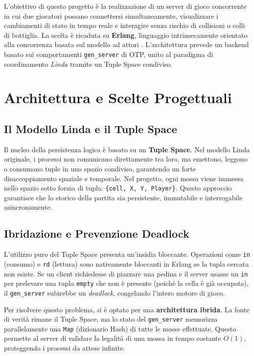 \documentclass{article}
\begin{document}
L'obiettivo di questo progetto \`e la realizzazione di un server di gioco concorrente in cui due giocatori possano connettersi simultaneamente, visualizzare i cambiamenti di stato in tempo reale e interagire senza rischio di collisioni o colli di bottiglia. La scelta \`e ricaduta su \textbf{Erlang}, linguaggio intrinsecamente orientato alla concorrenza basata sul modello ad attori \cite{erlangOTP}. L'architettura prevede un backend basato sui comportamenti \texttt{gen\_server} di OTP, unito al paradigma di coordinamento \textit{Linda} \cite{gelernter1985generative} tramite un Tuple Space condiviso.

\section{Architettura e Scelte Progettuali}

\subsection{Il Modello Linda e il Tuple Space}
Il nucleo della persistenza logica \`e basato su un \textbf{Tuple Space}. Nel modello Linda originale, i processi non comunicano direttamente tra loro, ma emettono, leggono o consumano tuple in uno spazio condiviso, garantendo un forte disaccoppiamento spaziale e temporale.
Nel progetto, ogni mossa viene immessa nello spazio sotto forma di tupla: \texttt{\{cell, X, Y, Player\}}. Questo approccio garantisce che lo storico della partita sia persistente, immutabile e interrogabile asincronamente.

\subsection{Ibridazione e Prevenzione Deadlock}
L'utilizzo puro del Tuple Space presenta un'insidia bloccante. Operazioni come \texttt{in} (consumo) e \texttt{rd} (lettura) sono nativamente bloccanti in Erlang se la tupla cercata non esiste. Se un client richiedesse di piazzare una pedina e il server usasse un \texttt{in} per prelevare una tupla \texttt{empty} che non \`e presente (poich\'e la cella \`e gi\`a occupata), il \texttt{gen\_server} subirebbe un \textit{deadlock}, congelando l'intero motore di gioco.

Per risolvere questo problema, si \`e optato per una \textbf{architettura ibrida}. La fonte di verit\`a rimane il Tuple Space, ma lo stato del \texttt{gen\_server} memorizza parallelamente una \texttt{Map} (dizionario Hash) di tutte le mosse effettuate. Questo permette al server di validare la legalit\`a di una mossa in tempo costante $O(1)$, proteggendo i processi da attese infinite.
\end{document}
